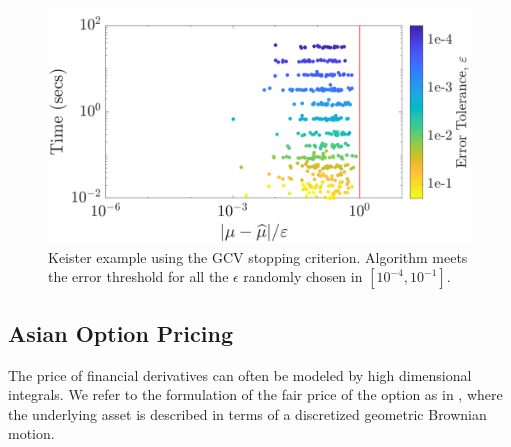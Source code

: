 \documentclass[graybox,footinfo]{svmult}
\begin{document}
\begin{figure}
\centering
\includegraphics[width=0.95\linewidth]{"figures/Sobol/Sobol_Keister_guaranteed_time_GCV__d4_r1_2019-Sep-1"}
\caption[Sobol: Keister guaranteed: GCV]{Keister example using the GCV stopping criterion. Algorithm meets the error threshold for all the $\epsilon$ randomly chosen in $[10^{-4}, 10^{-1}]$.}
\label{FJ:fig:Sobol-keister-guaranteed-GCV}
\end{figure}







\subsection{Asian Option Pricing}

The price of financial derivatives can often be modeled by high dimensional integrals. 
We refer to the formulation of the fair price of the option as in \cite{RatHic19a}, where the underlying asset is described in terms of a discretized geometric Brownian motion.
\end{document}
